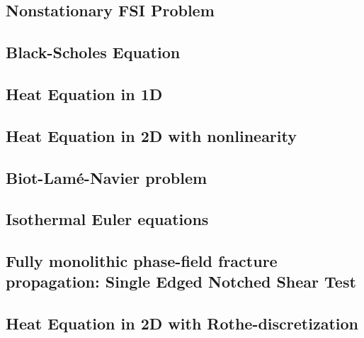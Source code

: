 \documentclass[a4paper,cleardoubleempty]{scrreprt}
\theoremstyle{plain}
\theoremstyle{remark}
\begin{document}
\subsection{Nonstationary FSI Problem}
\label{PDE_Instat_FSI}

\clearpage
\subsection{Black-Scholes Equation}
\label{PDE_Instat_Black_Scholes}

\clearpage
\subsection{Heat Equation in 1D}
\label{PDE_Instat_Heat_1D}

\clearpage
\subsection{Heat Equation in 2D with nonlinearity}
\label{PDE_Instat_Heat_2D}

\clearpage
\subsection{Biot-Lam\'e-Navier problem}
\label{PDE_Instat_biot_lame_navier}

\cleardoublepage
\subsection{Isothermal Euler equations}
\label{PDE_isothermal_euler}

\cleardoublepage
\subsection{Fully monolithic phase-field fracture propagation: Single Edged Notched Shear Test}
\label{PDE_phase_field_fracture}

\cleardoublepage
\subsection{Heat Equation in 2D with Rothe-discretization}
\label{PDE_Instat_Heat_Rothe}

\clearpage
\end{document}
